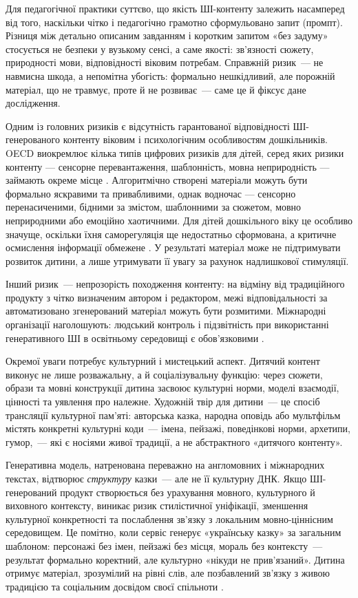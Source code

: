 \documentclass[14pt, a4paper]{extreport}
\begin{document}
Для педагогічної практики суттєво, що якість ШІ-контенту залежить насамперед від того, наскільки чітко і педагогічно грамотно сформульовано запит (промпт). Різниця між детально описаним завданням і коротким запитом «без задуму» стосується не безпеки у вузькому сенсі, а саме якості: зв'язності сюжету, природності мови, відповідності віковим потребам. Справжній ризик~--- не навмисна шкода, а непомітна убогість: формально нешкідливий, але порожній матеріал, що не травмує, проте й не розвиває~--- саме це й фіксує дане дослідження.

Одним із головних ризиків є відсутність гарантованої відповідності ШІ-генерованого контенту віковим і психологічним особливостям дошкільників. OECD виокремлює кілька типів цифрових ризиків для дітей, серед яких ризики контенту --- сенсорне перевантаження, шаблонність, мовна неприродність --- займають окреме місце \cite{OECD2021}. Алгоритмічно створені матеріали можуть бути формально яскравими та привабливими, однак водночас --- сенсорно перенасиченими, бідними за змістом, шаблонними за сюжетом, мовно неприродними або емоційно хаотичними. Для дітей дошкільного віку це особливо значуще, оскільки їхня саморегуляція ще недостатньо сформована, а критичне осмислення інформації обмежене \cite{PavelkivTsyhypalo2006,DutkevychDoshkilna2007,Radesky2023,OECD2025}. У результаті матеріал може не підтримувати розвиток дитини, а лише утримувати її увагу за рахунок надлишкової стимуляції.

Інший ризик~--- непрозорість походження контенту: на відміну від традиційного продукту з чітко визначеним автором і редактором, межі відповідальності за автоматизовано згенерований матеріал можуть бути розмитими. Міжнародні організації наголошують: людський контроль і підзвітність при використанні генеративного ШІ в освітньому середовищі є обов'язковими \cite{UNESCO2023,UNICEFAI2021,UNCRC25}.

Окремої уваги потребує культурний і мистецький аспект. Дитячий контент виконує не лише розважальну, а й соціалізувальну функцію: через сюжети, образи та мовні конструкції дитина засвоює культурні норми, моделі взаємодії, цінності та уявлення про належне. Художній твір для дитини~--- це спосіб трансляції культурної пам'яті: авторська казка, народна оповідь або мультфільм містять конкретні культурні коди~--- імена, пейзажі, поведінкові норми, архетипи, гумор,~--- які є носіями живої традиції, а не абстрактного «дитячого контенту».

Генеративна модель, натренована переважно на англомовних і міжнародних текстах, відтворює \textit{структуру} казки~--- але не її культурну ДНК. Якщо ШІ-генерований продукт створюється без урахування мовного, культурного й виховного контексту, виникає ризик стилістичної уніфікації, зменшення культурної конкретності та послаблення зв'язку з локальним мовно-ціннісним середовищем. Це помітно, коли сервіс генерує «українську казку» за загальним шаблоном: персонажі без імен, пейзажі без місця, мораль без контексту~--- результат формально коректний, але культурно «нікуди не прив'язаний». Дитина отримує матеріал, зрозумілий на рівні слів, але позбавлений зв'язку з живою традицією та соціальним досвідом своєї спільноти \cite{OECD2023,OECD2025,UNESCO2023}.
\end{document}
